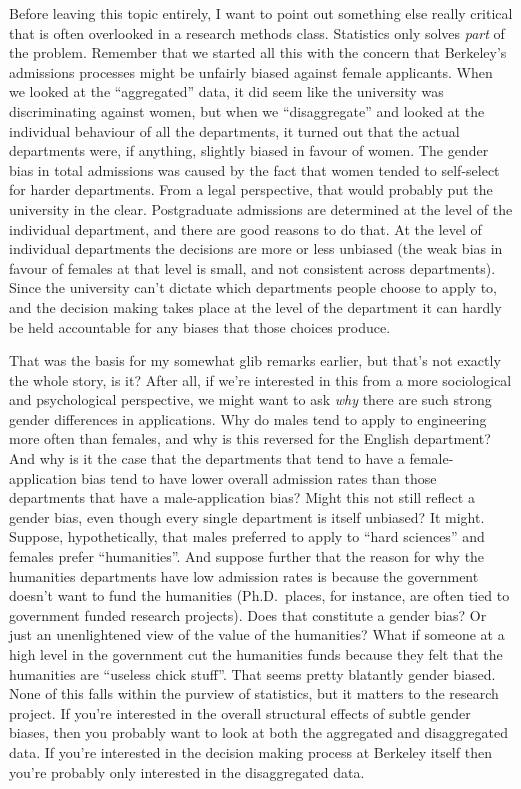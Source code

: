 \documentclass[
  a4paper,
]{book}
\begin{document}
Before leaving this topic entirely, I want to point out something else
really critical that is often overlooked in a research methods class.
Statistics only solves \emph{part} of the problem. Remember that we
started all this with the concern that Berkeley's admissions processes
might be unfairly biased against female applicants. When we looked at
the ``aggregated'' data, it did seem like the university was
discriminating against women, but when we ``disaggregate'' and looked at
the individual behaviour of all the departments, it turned out that the
actual departments were, if anything, slightly biased in favour of
women. The gender bias in total admissions was caused by the fact that
women tended to self-select for harder departments. From a legal
perspective, that would probably put the university in the clear.
Postgraduate admissions are determined at the level of the individual
department, and there are good reasons to do that. At the level of
individual departments the decisions are more or less unbiased (the weak
bias in favour of females at that level is small, and not consistent
across departments). Since the university can't dictate which
departments people choose to apply to, and the decision making takes
place at the level of the department it can hardly be held accountable
for any biases that those choices produce.

That was the basis for my somewhat glib remarks earlier, but that's not
exactly the whole story, is it? After all, if we're interested in this
from a more sociological and psychological perspective, we might want to
ask \emph{why} there are such strong gender differences in applications.
Why do males tend to apply to engineering more often than females, and
why is this reversed for the English department? And why is it the case
that the departments that tend to have a female-application bias tend to
have lower overall admission rates than those departments that have a
male-application bias? Might this not still reflect a gender bias, even
though every single department is itself unbiased? It might. Suppose,
hypothetically, that males preferred to apply to ``hard sciences'' and
females prefer ``humanities''. And suppose further that the reason for
why the humanities departments have low admission rates is because the
government doesn't want to fund the humanities (Ph.D.~places, for
instance, are often tied to government funded research projects). Does
that constitute a gender bias? Or just an unenlightened view of the
value of the humanities? What if someone at a high level in the
government cut the humanities funds because they felt that the
humanities are ``useless chick stuff''. That seems pretty blatantly
gender biased. None of this falls within the purview of statistics, but
it matters to the research project. If you're interested in the overall
structural effects of subtle gender biases, then you probably want to
look at both the aggregated and disaggregated data. If you're interested
in the decision making process at Berkeley itself then you're probably
only interested in the disaggregated data.
\end{document}
